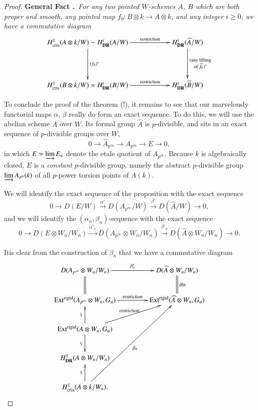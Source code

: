 \begin{proof}
\medskip
\noindent
{\bf General Fact .\label{art6-5.7.6}}~{\em For any two pointed $W$-schemes $A$, $B$ which are both proper and smooth, any pointed map $f_{0}:B\otimes k\to A\otimes k$, and any integer $i\geq 0$, we have a commutative diagram}
\begin{equation*}
\xymatrix@C=2cm@R=1.5cm{
H^{1}_{\text{cris}}(A\otimes k/W)\sim H^{i}_{\DR}(A/W) \ar[r]^-{\text{restriction}} \ar[d]^-{(f_{0})^{*}} & H^{i}_{\DR}(\widehat{A}/W)\ar[d]^-{\substack{\text{(any lifting}\\ \text{of $\widehat{f}_{0}$)$^{*}$}}}\\
H^{1}_{\text{cris}}(B\otimes k/W)\simeq H^{i}_{\DR}(B/W)\ar[r]^-{\text{restriction}} & H^{i}_{\DR}(\widehat{B}/W)
}
\end{equation*}

To conclude the proof of the theorem (!), it remains to see that our marvelously functorial maps $\alpha$, $\beta$ really do form an exact sequence. To do this, we will use the abelian scheme $A$ over $W$. Its formal group $\widehat{A}$ is $p$-divisible, and sits in an exact sequence of $p$-divisible groups over $W$,
$$
0\to \widehat{A}_{p^{\infty}}\to A_{p^{\infty}}\to E\to 0,
$$
in which $E=\varinjlim E_{n}$ denote the etale quotient of $A_{p^{\infty}}$. Because $k$ is algebraically closed, $E$ is a {\em constant} $p$-divisible group, namely the abstract $p$-divisible group $\varinjlim A_{p^{n}}(k)$ of all $p$-power torsion points of $A(k)$.

We will identify the exact sequence of the proposition with the exact sequence
$$
0\to D(E/W)\xrightarrow{\alpha'}D(A_{p^{\infty}}/W)\xrightarrow{\beta'}D(\widehat{A}/W)\to 0,
$$
and we will identify the $(\alpha_{n},\beta_{n})$-sequence with the exact sequence
$$
0\to D(E\otimes W_{n}/W_{n})\xrightarrow{\alpha'_{n}}D(A_{p^{\infty}}\otimes W_{n}/W_{n})\xrightarrow{\beta'_{n}}D(\widehat{A}\otimes W_{n}/W_{n})\to 0.
$$

\eject

It\pageoriginale is clear from the construction of $\beta_{n}$ that we have a commutative diagram
\[
\xymatrix@C=1.5cm{
D(A_{p^{\infty}}\otimes W_{n}/W_{n})\ar@{=}[d]\ar[r]^-{\beta'_{n}} & D(\widehat{A}\otimes W_{n}/W_{n})\ar@{=}[d]^-{\text{dfn}}\\
\Ext^{\text{rigid}}(A_{p^{\infty}}\otimes W_{n},G_{a})\ar[r]^-{\text{restriction}} & \Ext^{\text{rigid}}(\widehat{A}\otimes W_{n},G_{a})\\
\Ext^{\text{rigid}}(A\otimes W_{n},G_{a})\ar[u]^{\rotatebox{90}{$\backsim$}}\ar[d]_{\rotatebox{90}{$\backsim$}}\ar[ur]^-{\text{restriction}}  &\\
H^{1}_{\DR}(A\otimes W_{n}/W_{n}) &\\
H^{1}_{\text{cris}}(A\otimes k/W_{n}).\ar[u]^{\rotatebox{90}{$\backsim$}} \ar[uuur]_{\beta_{n}}
}
\]


\end{proof}
